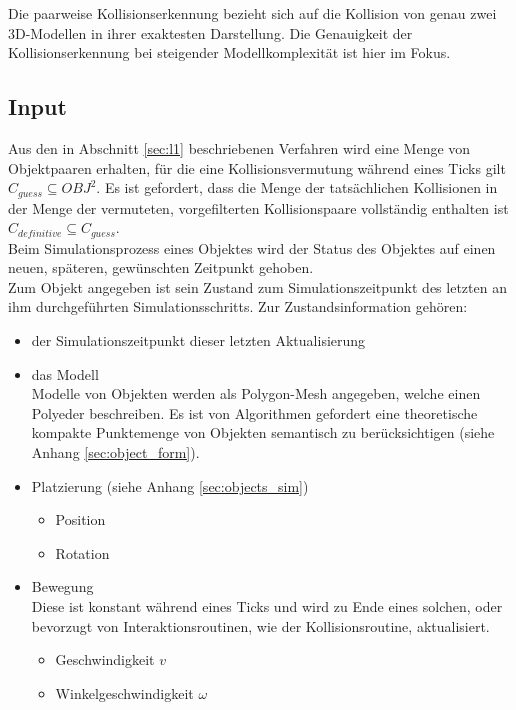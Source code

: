 \label{sec:l2}
Die paarweise Kollisionserkennung bezieht sich auf die Kollision von genau zwei 3D-Modellen in ihrer exaktesten Darstellung. Die Genauigkeit der Kollisionserkennung bei steigender Modellkomplexität ist hier im Fokus.

\subsection{Input}
Aus den in Abschnitt \ref{sec:l1} beschriebenen Verfahren wird eine Menge von Objektpaaren erhalten, für die eine Kollisionsvermutung während eines Ticks gilt $C_{guess}\subseteq OBJ^2$. Es ist gefordert, dass die Menge der tatsächlichen Kollisionen in der Menge der vermuteten, vorgefilterten Kollisionspaare vollständig enthalten ist $C_{definitive}\subseteq C_{guess}$.\\
Beim Simulationsprozess eines Objektes wird der Status des Objektes auf einen neuen, späteren, gewünschten Zeitpunkt gehoben.\\
Zum Objekt angegeben ist sein Zustand zum Simulationszeitpunkt des letzten an ihm durchgeführten Simulationsschritts. Zur Zustandsinformation gehören:
\begin{itemize}
\item der Simulationszeitpunkt dieser letzten Aktualisierung
\item das Modell\\
Modelle von Objekten werden als Polygon-Mesh \cites{fourcrossfour}{ogl} angegeben, welche einen Polyeder beschreiben. Es ist von Algorithmen gefordert eine theoretische kompakte Punktemenge von Objekten semantisch zu berücksichtigen (siehe Anhang \ref{sec:object_form}).
\item Platzierung (siehe Anhang \ref{sec:objects_sim})
\begin{itemize}
\item Position
\item Rotation
\end{itemize}
\item Bewegung\\
Diese ist konstant während eines Ticks und wird zu Ende eines solchen, oder bevorzugt von Interaktionsroutinen, wie der Kollisionsroutine, aktualisiert.
\begin{itemize}
\item Geschwindigkeit $v$
\item Winkelgeschwindigkeit $\omega$
\end{itemize}
\end{itemize}

